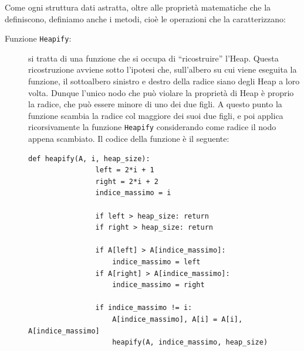 \documentclass[12pt]{report}
\begin{document}
    Come ogni struttura dati astratta, oltre alle proprietà matematiche che la definiscono, definiamo anche i metodi, cioè le operazioni che la caratterizzano:
    \begin{description}
    	\item[Funzione \texttt{Heapify}:] si tratta di una funzione che si occupa di ``ricostruire'' l'Heap. Questa ricostruzione avviene sotto l'ipotesi che, sull'albero su cui viene eseguita la funzione, il sottoalbero sinistro e destro della radice siano degli Heap a loro volta. Dunque l'unico nodo che può violare la proprietà di Heap è proprio la radice, che può essere minore di uno dei due figli. A questo punto la funzione scambia la radice col maggiore dei suoi due figli, e poi applica ricorsivamente la funzione \texttt{Heapify} considerando come radice il nodo appena scambiato.
    	Il codice della funzione è il seguente:
    	\begin{lstlisting}[caption={Funzione heapify}]
    		def heapify(A, i, heap_size):
    			left = 2*i + 1
    			right = 2*i + 2
    			indice_massimo = i
    			
    			if left > heap_size: return
    			if right > heap_size: return
    			
    			if A[left] > A[indice_massimo]:
    				indice_massimo = left
    			if A[right] > A[indice_massimo]:
    				indice_massimo = right
    				
    			if indice_massimo != i:
    				A[indice_massimo], A[i] = A[i], A[indice_massimo]
    				heapify(A, indice_massimo, heap_size)
    	\end{lstlisting}
    	

\end{description}
\end{document}
